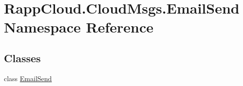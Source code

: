 \hypertarget{namespaceRappCloud_1_1CloudMsgs_1_1EmailSend}{\section{Rapp\-Cloud.\-Cloud\-Msgs.\-Email\-Send Namespace Reference}
\label{namespaceRappCloud_1_1CloudMsgs_1_1EmailSend}
}
\subsection*{Classes}
\begin{DoxyCompactItemize}
\item 
class \hyperlink{classRappCloud_1_1CloudMsgs_1_1EmailSend_1_1EmailSend}{Email\-Send}
\end{DoxyCompactItemize}
